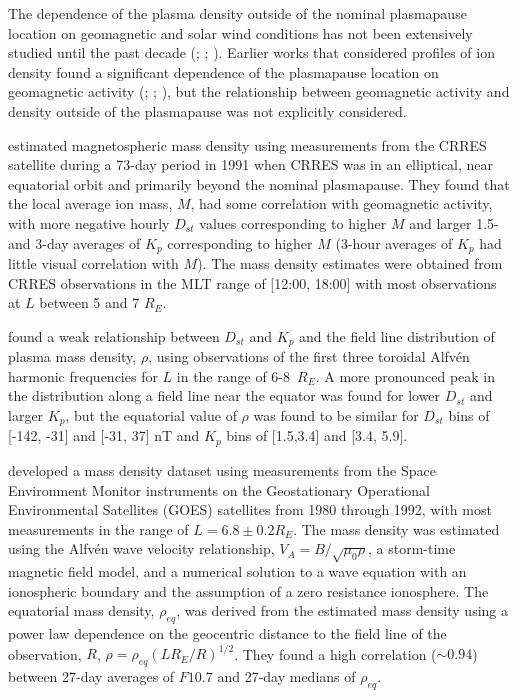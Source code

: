 \documentclass[draft,linenumbers]{agujournal}
\begin{document}
The dependence of the plasma density outside of the nominal plasmapause location on geomagnetic and solar wind conditions has not been extensively studied until the past decade (\citet{Takahashi2006}; \citet{Takahashi2010}; \citet{Denton2016}). Earlier works that considered profiles of ion density found a significant dependence of the plasmapause location on geomagnetic activity (\citet{Chappell1970}; \citet{Maynard1977}; \citet{Carpenter1992}), but the relationship between geomagnetic activity and density outside of the plasmapause was not explicitly considered.

\citet{Takahashi2006} estimated magnetospheric mass density using measurements from the CRRES satellite during a 73-day period in 1991 when CRRES was in an elliptical, near equatorial orbit and primarily beyond the nominal plasmapause. They found that the local average ion mass, $M$, had some correlation with geomagnetic activity, with more negative hourly $D_{st}$ values corresponding to higher $M$ and larger 1.5- and 3-day averages of $K_p$ corresponding to higher $M$ (3-hour averages of $K_p$ had little visual correlation with $M$). The mass density estimates were obtained from CRRES observations in the MLT range of [12:00, 18:00] with most observations at $L$ between 5 and 7 $R_E$.

\citet{Denton2006} found a weak relationship between $D_{st}$ and $K_p$ and the field line distribution of plasma mass density, $\rho$, using observations of the first three toroidal Alfv\'en harmonic frequencies for $L$ in the range of 6-8~$R_E$.  A more pronounced peak in the distribution along a field line near the equator was found for lower $D_{st}$ and larger $K_p$, but the equatorial value of $\rho$ was found to be similar for $D_{st}$ bins of [-142, -31] and [-31, 37] nT and $K_p$ bins of [1.5,3.4] and [3.4, 5.9].

\citet{Takahashi2010} developed a mass density dataset using measurements from the Space Environment Monitor instruments on the Geostationary Operational Environmental Satellites (GOES) satellites from 1980 through 1992, with most measurements in the range of $L=6.8\pm0.2 R_E$. The mass density was estimated using the Alfv\'en wave velocity relationship, $V_A=B/\sqrt{\mu_0\rho}$, a storm-time magnetic field model, and a numerical solution to a wave equation with an ionospheric boundary and the assumption of a zero resistance ionosphere.  The equatorial mass density, $\rho_{eq}$, was derived from the estimated mass density using a power law dependence on the geocentric distance to the field line of the observation, $R$, $\rho=\rho_{eq}(LR_E/R)^{1/2}$.  They found a high correlation ($\sim 0.94$) between 27-day averages of $F10.7$ and 27-day medians of $\rho_{eq}$.
\end{document}

